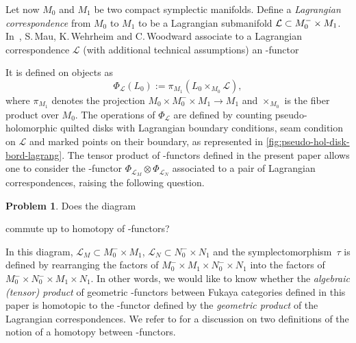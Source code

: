 \documentclass[JEP,XML,SOM,NoFloatCountersInSection,Unicode,published]{cedram}
\let\dpl\displaystyle
\theoremstyle{definition}
\newtheorem*{problem}{Problem}
\theoremstyle{plain}
\begin{document}
Let now $M_0$ and $M_1$ be two compact symplectic manifolds. Define a \emph{\hbox{Lagrangian} correspondence} from $M_0$ to $M_1$ to be a Lagrangian submanifold $\mathcal{L} \subset M_0^{-} \times\nobreak M_1$.
In~\cite{mau-wehrheim-woodward}, S.\,Mau, K.\,Wehrheim and C.\,Woodward associate to a Lagrangian correspondence $\mathcal{L}$ (with additional technical assumptions) an \Ainf -functor
\begin{center}
\end{center}
It is defined on objects as
\[
\Phi_{\mathcal{L}} (L_0) := \pi_{M_1} (L_0 \times_{M_0} \mathcal{L}),
\]
where $\pi_{M_1}$ denotes the projection $M_0 \times M_0^{-} \times M_1 \to M_1$ and $\times_{M_0}$ is the fiber product over $M_0$. The operations of $\Phi_{\mathcal{L}}$ are defined by counting pseudo-holomorphic quilted disks with Lagrangian boundary conditions, seam condition on $\mathcal{L}$ and marked points on their boundary, as represented in \cref{fig:pseudo-hol-disk-bord-lagrang}.
The tensor product of \Ainf-functors defined in the present paper allows one to consider the \Ainf-functor $\Phi_{\mathcal{L}_M} \otimes \Phi_{\mathcal{L}_N}$ associated to a pair of Lagrangian correspondences, raising the following question.

\begin{problem} \label{problem}
Does the diagram
\begin{center}
\end{center}
commute up to homotopy of \Ainf -functors?
\end{problem}

In this diagram, $\mathcal{L}_M \subset M_0^{-} \times M_1$, $\mathcal{L}_N \subset N_0^- \times N_1$ and the symplectomorphism~$\tau$ is defined by rearranging the factors of $M_0^{-} \times M_1 \times N_0^- \times N_1$ into the factors of \hbox{$M_0^{-} \times N_0^- \times M_1 \times N_1$}. In other words, we would like to know whether the \emph{algebraic (tensor) product} of geometric \Ainf -functors between Fukaya categories defined in this paper is homotopic to the \Ainf -functor defined by the \emph{geometric product} of the Lagrangian correspondences.
We refer to \cite[\S 13]{fukaya-unobstructed} for a discussion on two definitions of the notion of a homotopy between \Ainf -functors.

\backmatter


\end{document}
